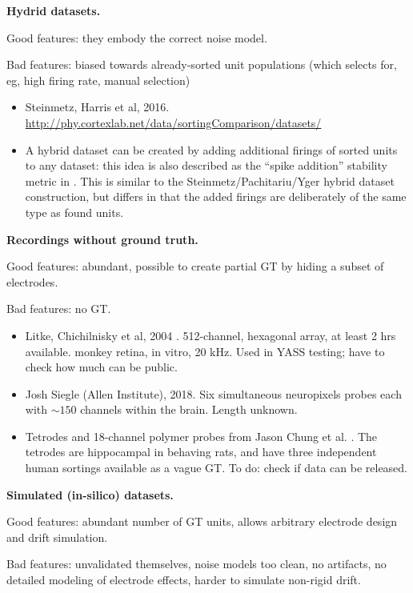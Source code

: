 \documentclass[10pt]{article}
\newcommand{\bi}{\begin{itemize}}
\newcommand{\ei}{\end{itemize}}
\begin{document}
\item {\bf Hydrid datasets.}
  
  Good features: they embody the correct noise model.
  
  Bad features: biased towards already-sorted unit populations
  (which selects for, eg, high firing rate, manual selection)

  \bi
\item Steinmetz, Harris et al, 2016.
  \url{http://phy.cortexlab.net/data/sortingComparison/datasets/}
\item A hybrid dataset can be created by adding additional firings of
  sorted units to any dataset:
  this idea is also described as the ``spike addition'' stability metric in
  \cite{validspike}. This is similar to the Steinmetz/Pachitariu/Yger
  hybrid dataset construction, but differs in that the added firings are
  deliberately of the same type as found units.
  \ei
  
\item {\bf Recordings without ground truth.}

  Good features: abundant, possible to create partial GT by hiding a subset of electrodes.

  Bad features: no GT.
  
  \bi
\item Litke, Chichilnisky et al, 2004 \cite{litke}. 512-channel,
  hexagonal array, at least 2 hrs available.
  monkey retina, in vitro, 20 kHz.
  Used in YASS testing; have to check how much can be public.
  
\item Josh Siegle (Allen Institute), 2018. Six simultaneous neuropixels probes
  each with $\sim150$ channels within the brain. Length unknown.

\item Tetrodes and
  18-channel polymer probes from Jason Chung et al. \cite{mountainsort}.
  The tetrodes are hippocampal in behaving rats, and have three independent
  human sortings available as a vague GT.
  To do: check if data can be released.
  
\ei

  \item {\bf Simulated (in-silico) datasets.}
  
    Good features: abundant number of GT units,
    allows arbitrary electrode design and drift
    simulation.

  Bad features: unvalidated themselves,
  noise models too clean, no artifacts, no detailed modeling
  of electrode effects, harder to simulate non-rigid drift.
\end{document}

